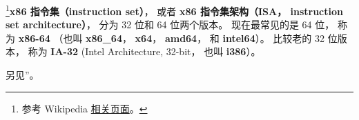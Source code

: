 
\begin{issues}
\issueDraft
\end{issues}

\footnote{参考 Wikipedia \href{https://en.wikipedia.org/wiki/X86-64}{相关页面}。}\textbf{x86 指令集（instruction set）}， 或者 \textbf{x86 指令集架构（ISA， instruction set architecture）}， 分为 32 位和 64 位两个版本。 现在最常见的是 64 位， 称为 \textbf{x86-64} （也叫 \textbf{x86_64}， \textbf{x64}， \textbf{amd64}， 和 \textbf{intel64}）。 比较老的 32 位版本， 称为 \textbf{IA-32} (Intel Architecture, 32-bit， 也叫 \textbf{i386}）。

另见”。
